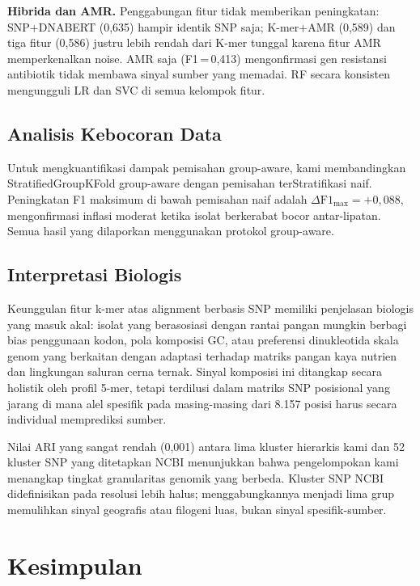 \documentclass{article}
\begin{document}
\textbf{Hibrida dan AMR.}
Penggabungan fitur tidak memberikan peningkatan: SNP+DNABERT (0,635) hampir
identik SNP saja; K-mer+AMR (0,589) dan tiga fitur (0,586) justru lebih
rendah dari K-mer tunggal karena fitur AMR memperkenalkan noise. AMR saja
(F1\,=\,0,413) mengonfirmasi gen resistansi antibiotik tidak membawa sinyal
sumber yang memadai. RF secara konsisten mengungguli LR dan SVC di semua
kelompok fitur.

\subsection{Analisis Kebocoran Data}

Untuk mengkuantifikasi dampak pemisahan group-aware, kami membandingkan
StratifiedGroupKFold group-aware dengan pemisahan terStratifikasi naif.
Peningkatan F1 maksimum di bawah pemisahan naif adalah
$\Delta\text{F1}_{\max} = +0{,}088$, mengonfirmasi inflasi moderat ketika
isolat berkerabat bocor antar-lipatan. Semua hasil yang dilaporkan menggunakan
protokol group-aware.

\subsection{Interpretasi Biologis}

Keunggulan fitur k-mer atas alignment berbasis SNP memiliki penjelasan biologis
yang masuk akal: isolat yang berasosiasi dengan rantai pangan mungkin berbagi
bias penggunaan kodon, pola komposisi GC, atau preferensi dinukleotida skala
genom yang berkaitan dengan adaptasi terhadap matriks pangan kaya nutrien dan
lingkungan saluran cerna ternak. Sinyal komposisi ini ditangkap secara holistik
oleh profil 5-mer, tetapi terdilusi dalam matriks SNP posisional yang jarang
di mana alel spesifik pada masing-masing dari 8.157 posisi harus secara
individual memprediksi sumber.

Nilai ARI yang sangat rendah (0,001) antara lima kluster hierarkis kami dan
52 kluster SNP yang ditetapkan NCBI menunjukkan bahwa pengelompokan kami
menangkap tingkat granularitas genomik yang berbeda. Kluster SNP NCBI
didefinisikan pada resolusi lebih halus; menggabungkannya menjadi lima grup
memulihkan sinyal geografis atau filogeni luas, bukan sinyal spesifik-sumber.

\section{Kesimpulan}
\end{document}
